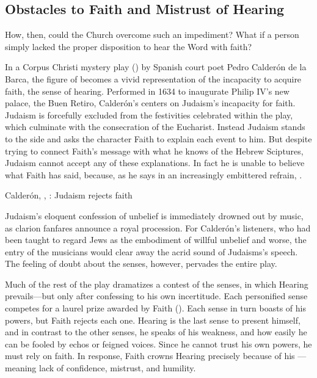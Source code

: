 \subsection{Obstacles to Faith and Mistrust of Hearing}

How, then, could the Church overcome such an impediment?
What if a person simply lacked the proper disposition to hear the Word with faith?

In a Corpus Christi mystery play () by Spanish court poet Pedro Calderón de la Barca, the figure of  becomes a vivid representation of the incapacity to acquire faith,  the sense of hearing.
Performed in 1634 to inaugurate Philip IV's new palace, the Buen Retiro, Calderón's  centers on Judaism's incapacity for faith.%
  \autocite{Calderon:Retiro}
Judaism is forcefully excluded from the festivities celebrated within the play, which culminate with the consecration of the Eucharist.
Instead Judaism stands to the side and asks the character Faith to explain each event to him.
But despite trying to connect Faith's message with what he knows of the Hebrew Sciptures, Judaism cannot accept any of these explanations.
In fact he is unable to believe what Faith has said, because, as he says in an increasingly embittered refrain, .

\begin{expoem}
\caption{Calderón, , : Judaism rejects faith}
\label{expoem:Calderon-Retiro-Judaismo}
\end{expoem}

Judaism's eloquent confession of unbelief is immediately drowned out by music, as clarion fanfares announce a royal procession.
For Calderón's listeners, who had been taught to regard Jews as the embodiment of willful unbelief and worse, the entry of the musicians would clear away the acrid sound of Judaisms's speech.
The feeling of doubt about the senses, however, pervades the entire play.

Much of the rest of the play dramatizes a contest of the senses, in which Hearing prevails---but only after confessing to his own incertitude.
Each personified sense competes for a laurel prize awarded by Faith ().
Each sense in turn boasts of his powers, but Faith rejects each one.
Hearing is the last sense to present himself, and in contrast to the other senses, he speaks of his weakness, and how easily he can be fooled by echos or feigned voices.
Since he cannot trust his own powers, he must rely on faith.
In response, Faith crowns Hearing precisely because of his ---meaning lack of confidence, mistrust, and humility.

